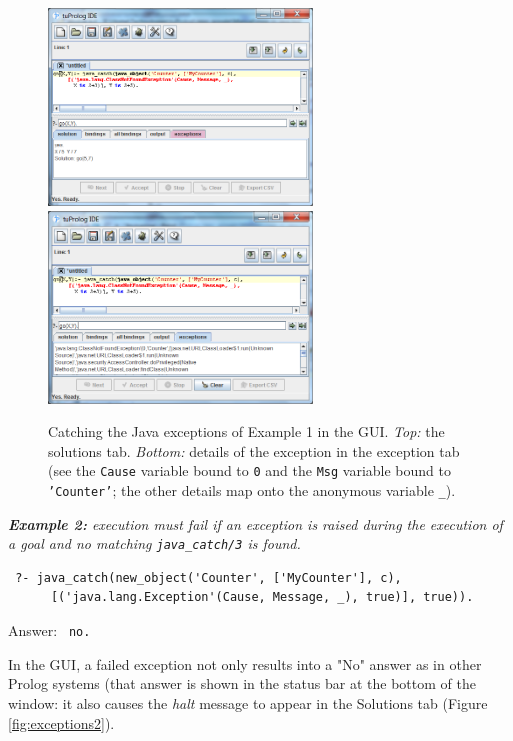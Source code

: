 \begin{figure}
  \centering
  \includegraphics[width=7cm]{images/exceptions1a}
  \includegraphics[width=7cm]{images/exceptions1b}
  \caption{Catching the Java exceptions of Example 1 in the \tuprolog{} GUI.
  \textit{Top:} the solutions tab.
  \textit{Bottom:} details of the exception in the exception tab (see the \texttt{Cause} variable bound to \texttt{0} and the \texttt{Msg} variable bound to \texttt{'Counter'}; the other details map onto the anonymous variable \texttt{\_}). }\label{fig:exceptions1}
\end{figure}


\medskip\noindent
\textit{\textbf{Example 2:} execution must fail if an exception is raised during the execution of a goal and no matching \texttt{java\_catch/3} is found.}
\begin{verbatim}
 ?- java_catch(new_object('Counter', ['MyCounter'], c),
      [('java.lang.Exception'(Cause, Message, _), true)], true)).
\end{verbatim}

Answer: \texttt{ no.}

\noindent In the \tuprolog{} GUI, a failed exception not only results into a "No" answer as in other Prolog systems (that answer is shown in the status bar at the bottom of the window: it also causes the \textit{halt} message to appear in the Solutions tab (Figure \ref{fig:exceptions2}).


